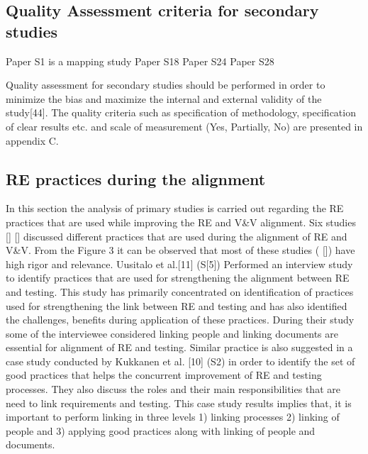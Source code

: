 \documentclass{article}
\begin{document}
\subsection{Quality Assessment criteria for secondary studies}
Paper S1 is a mapping study 
Paper S18 
Paper S24 
Paper S28 


Quality assessment for secondary studies should be performed in order to minimize the bias and maximize the internal and external validity of the study[44]. The quality criteria such as specification of methodology, specification of clear results etc. and scale of measurement (Yes, Partially, No) are presented in appendix C. 

\subsection{RE practices during the alignment}\label{ResultsPracticesDuringAllignment}

In this section the analysis of primary studies is carried out regarding the RE practices that are used while improving the RE and V\&V alignment. 
Six studies \cite{barmi2011alignmentS1} \cite{kukkanen2009applyingS2} \cite{uusitalo2008linkingS5} \cite{bjarnason2014challengesS9} [\cite{bjarnason2015industrialS14}] [\cite{bjarnason2014alignment}] discussed different practices that are used during the alignment of RE and V\&V. From the Figure 3 it can be observed that most of these studies (\cite{kukkanen2009applyingS2} \cite{uusitalo2008linkingS5} \cite{bjarnason2014challengesS9} [\cite{bjarnason2014alignment}]) have high rigor and relevance. Uusitalo et al.[11] (S[5]) Performed an interview study to identify practices that are used for strengthening the alignment between RE and testing. This study has primarily concentrated on identification of practices used for strengthening the link between RE and testing and has also identified the challenges, benefits during application of these practices. During their study some of the interviewee considered linking people and linking documents are essential for alignment of RE and testing. Similar practice is also suggested in a case study conducted by Kukkanen et al. [10] (S2\cite{bjarnason2014challengesS9}) in order to identify the set of good practices that helps the concurrent improvement of RE and testing processes.  They also discuss the roles and their main responsibilities that are need to link requirements and testing. This case study results implies that, it is important to perform linking in three levels 1) linking processes 2) linking of people and 3) applying good practices along with linking of people and documents.
\end{document}
